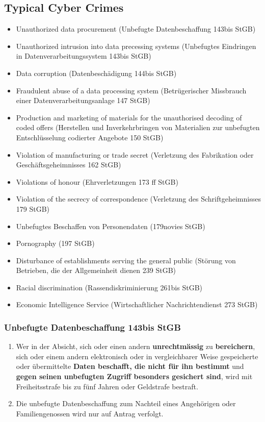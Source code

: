 \documentclass[11pt]{article}
\theoremstyle{definition}
\begin{document}
\subsection{Typical Cyber Crimes}
\begin{itemize}[noitemsep]
	\item Unauthorized data procurement (Unbefugte Datenbeschaffung 143bis StGB)
	\item Unauthorized intrusion into data precessing systems (Unbefugtes Eindringen in Datenverarbeitungssystem 143bis StGB)
	\item Data corruption (Datenbeschädigung 144bis StGB)
	\item Fraudulent abuse of a data processing system (Betrügerischer Missbrauch einer Datenverarbeitungsanlage 147 StGB)
	\item Production and marketing of materials for the unauthorised decoding of coded offers (Herstellen und Inverkehrbringen von Materialien zur unbefugten Entschlüsselung codierter Angebote 150 StGB)
	\item Violation of manufacturing or trade secret (Verletzung des Fabrikation oder Geschäftsgeheimnisses 162 StGB)
	\item Violations of honour (Ehrverletzungen 173 ff StGB)
	\item Violation of the secrecy of correspondence (Verletzung des Schriftgeheimnisses 179 StGB)
	\item Unbefugtes Beschaffen von Personendaten (179novies StGB)
	\item Pornography (197 StGB)
	\item Disturbance of establishments serving the general public (Störung von Betrieben, die der Allgemeinheit dienen 239 StGB)
	\item Racial discrimination (Rassendiskriminierung 261bis StGB)
	\item Economic Intelligence Service (Wirtschaftlicher Nachrichtendienst 273 StGB)
\end{itemize}

\subsubsection{Unbefugte Datenbeschaffung 143bis StGB}
\begin{enumerate}[label=\arabic* ]
	\item Wer in der Absicht, sich oder einen andern \textbf{unrechtmässig} zu \textbf{bereichern}, sich oder einem andern elektronisch oder in vergleichbarer Weise gespeicherte oder übermittelte \textbf{Daten beschafft, die nicht für ihn bestimmt} und \textbf{gegen seinen unbefugten Zugriff besonders gesichert sind}, wird mit Freiheitsstrafe bis zu fünf Jahren oder Geldstrafe bestraft.
	\item Die unbefugte Datenbeschaffung zum Nachteil eines Angehörigen oder Familiengenossen wird nur auf Antrag verfolgt.
\end{enumerate}
\end{document}
